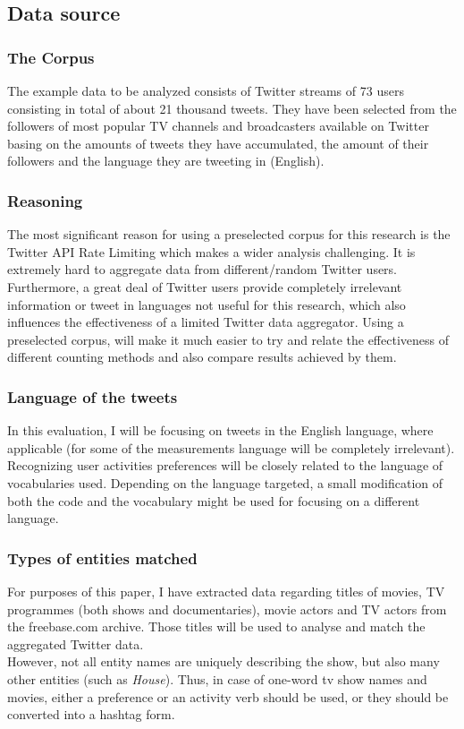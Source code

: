 \documentclass{article}
\begin{document}
\subsection{Data source}
\subsubsection{The Corpus}
The example data to be analyzed consists of Twitter streams of 73 users
consisting in total of about 21 thousand tweets. They have been selected from the followers of most popular TV channels and broadcasters available on Twitter basing on the amounts of tweets they have accumulated, the amount of their followers and the language they are tweeting in (English).

\subsubsection{Reasoning}
The most significant reason for using a preselected corpus for this research is
the Twitter API Rate Limiting which makes a wider analysis challenging. It is
extremely hard to aggregate data from different/random Twitter users.
Furthermore, a great deal of Twitter users provide completely irrelevant
information or tweet in languages not useful for this research, which also
influences the effectiveness of a limited Twitter data aggregator. Using a preselected corpus, will make it much easier to try and relate the effectiveness of different counting methods and also compare results achieved by them.

\subsubsection{Language of the tweets}
In this evaluation, I will be focusing on tweets in the English language, where
applicable (for some of the measurements language will be completely
    irrelevant). \\ Recognizing user activities preferences will be closely
related to the language of vocabularies used. Depending on the language
targeted, a small modification of both the code and the vocabulary might be used
for focusing on a different language.

\subsubsection{Types of entities matched}
For purposes of this paper, I have extracted data regarding titles of movies, TV
programmes (both shows and documentaries), movie actors and TV actors from the
freebase.com archive. Those titles will be used to analyse and match the
aggregated Twitter data.
\\ However, not all entity names are uniquely describing the show, but also many
other entities (such as \textit{House}). Thus, in case of one-word tv show names and
movies, either a preference or an activity verb should be used, or they should
be converted into a hashtag form.
\end{document}
